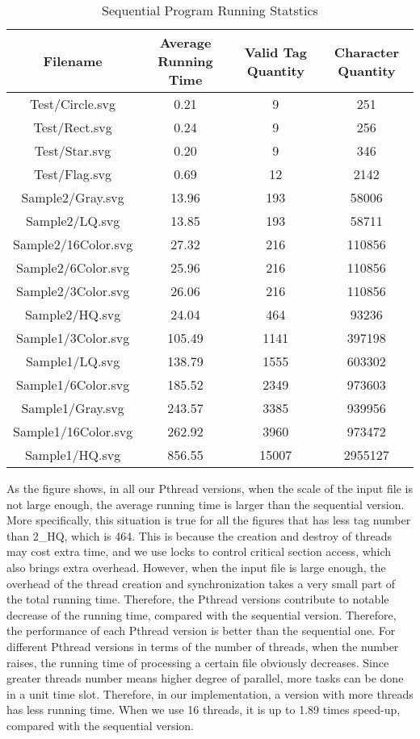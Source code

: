 \documentclass[10pt,twocolumn,letterpaper]{article}
\numberwithin{figure}{section}
\begin{document}
\begin{table*}[ht]\centering\begin{center}
\begin{tabular}{cccc}
Filename & Average Running Time & Valid Tag Quantity & Character Quantity \\
\hline

Test/Circle.svg & 0.21 & 9 & 251 \\
Test/Rect.svg & 0.24 & 9 & 256 \\
Test/Star.svg & 0.20 & 9 & 346 \\
Test/Flag.svg & 0.69 & 12 & 2142 \\
Sample2/Gray.svg & 13.96 & 193 & 58006 \\
Sample2/LQ.svg & 13.85 & 193 & 58711 \\
Sample2/16Color.svg & 27.32 & 216 & 110856 \\
Sample2/6Color.svg & 25.96 & 216 & 110856 \\
Sample2/3Color.svg & 26.06 & 216 & 110856 \\
Sample2/HQ.svg & 24.04 & 464 & 93236 \\
Sample1/3Color.svg & 105.49 & 1141 & 397198 \\
Sample1/LQ.svg & 138.79 & 1555 & 603302 \\
Sample1/6Color.svg & 185.52 & 2349 & 973603 \\
Sample1/Gray.svg & 243.57 & 3385 & 939956 \\
Sample1/16Color.svg & 262.92 & 3960 & 973472 \\
Sample1/HQ.svg & 856.55 & 15007 & 2955127 \\
\hline
\end{tabular}\end{center}\caption{Sequential Program Running Statstics}\label{result table}
\end{table*}

As the figure shows, in all our Pthread versions, when the scale of the input file is not large enough, the average running time is larger than the sequential version. More specifically, this situation is true for all the figures that has less tag number than 2\_HQ, which is 464. This is because the creation and destroy of threads may cost extra time, and we use locks to control critical section access, which also brings extra overhead. However, when the input file is large enough, the overhead of the thread creation and synchronization takes a very small part of the total running time. Therefore, the Pthread versions contribute to notable decrease of the running time, compared with the sequential version. Therefore, the performance of each Pthread version is better than the sequential one.
\newline
For different Pthread versions in terms of the number of threads, when the number raises, the running time of processing a certain file obviously decreases. Since greater threads number means higher degree of parallel, more tasks can be done in a unit time slot. Therefore, in our implementation, a version with more threads has less running time. When we use 16 threads, it is up to 1.89 times speed-up, compared with the sequential version.
\newline
\end{document}
